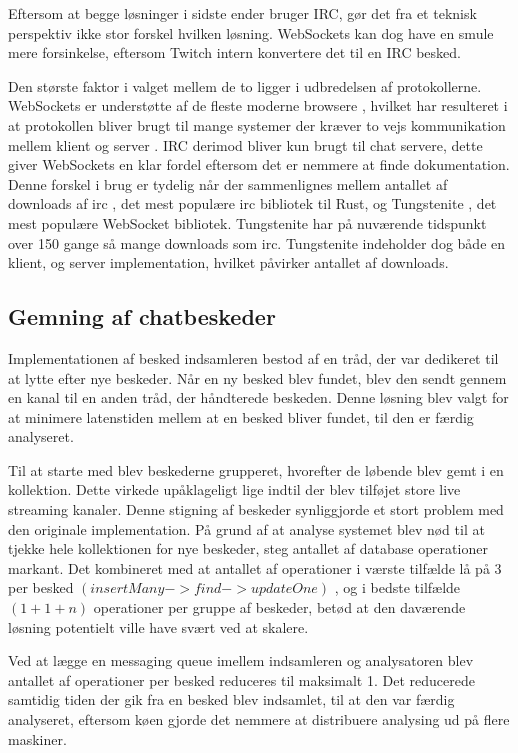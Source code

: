 \documentclass{article}
\begin{document}
Eftersom at begge løsninger i sidste ender bruger IRC, gør det fra et teknisk perspektiv ikke stor forskel hvilken løsning. WebSockets kan dog have en smule mere forsinkelse, eftersom Twitch intern konvertere det til en IRC besked.

Den største faktor i valget mellem de to ligger i udbredelsen af protokollerne. WebSockets er understøtte af de fleste moderne browsere \cite{caniuse_websockets}, hvilket har resulteret i at protokollen bliver brugt til mange systemer der kræver to vejs kommunikation mellem klient og server \cite{murley_websocket_2021}. IRC derimod bliver kun brugt til chat servere, dette giver WebSockets en klar fordel eftersom det er nemmere at finde dokumentation.
Denne forskel i brug er tydelig når der sammenlignes mellem antallet af downloads af irc \cite{cratesio_irc_nodate}, det mest populære irc bibliotek til Rust, og Tungstenite \cite{cratesio_tungstenite_nodate}, det mest populære WebSocket bibliotek. Tungstenite har på nuværende tidspunkt over 150 gange så mange downloads som irc. Tungstenite indeholder dog både en klient, og server implementation, hvilket påvirker antallet af downloads.


\subsection{Gemning af chatbeskeder}
Implementationen af besked indsamleren bestod af en tråd, der var dedikeret til at lytte efter nye beskeder. Når en ny besked blev fundet, blev den sendt gennem en kanal til en anden tråd, der håndterede beskeden. Denne løsning blev valgt for at minimere latenstiden mellem at en besked bliver fundet, til den er færdig analyseret.

Til at starte med blev beskederne grupperet, hvorefter de løbende blev gemt i en kollektion. Dette virkede upåklageligt lige indtil der blev tilføjet store live streaming kanaler. Denne stigning af beskeder synliggjorde et stort problem med den originale implementation. På grund af at analyse systemet blev nød til at tjekke hele kollektionen for nye beskeder, steg antallet af database operationer markant. Det kombineret med at antallet af operationer i værste tilfælde lå på 3 per besked \((insertMany -> find -> updateOne)\) , og i bedste tilfælde \((1 + 1 + n)\) operationer per gruppe af beskeder, betød at den daværende løsning potentielt ville have svært ved at skalere.

Ved at lægge en messaging queue imellem indsamleren og analysatoren blev antallet af operationer per besked reduceres til maksimalt 1. Det reducerede samtidig tiden der gik fra en besked blev indsamlet, til at den var færdig analyseret, eftersom køen gjorde det nemmere at distribuere analysing ud på flere maskiner.
\end{document}
